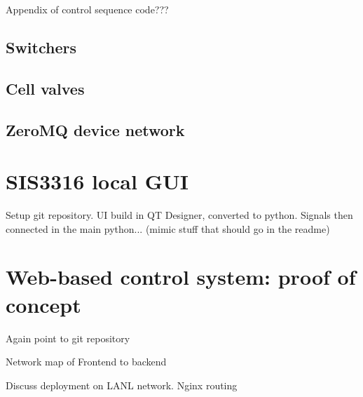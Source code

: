 Appendix of control sequence code???


\subsection{Switchers}



\subsection{Cell valves}



\subsection{ZeroMQ device network}



\section{SIS3316 local GUI}


Setup git repository. UI build in QT Designer, converted to python. Signals then connected in the main python... (mimic stuff that should go in the readme)


\section{Web-based control system: proof of concept}


Again point to git repository

Network map of Frontend to backend

Discuss deployment on LANL network. Nginx routing